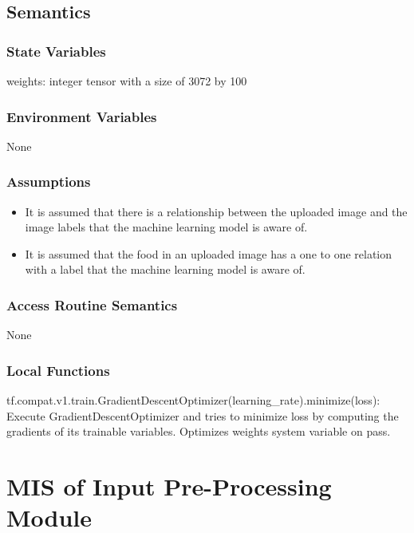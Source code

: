 \documentclass[12pt, titlepage]{article}
\begin{document}
\subsection{Semantics}

\subsubsection{State Variables}

weights: integer tensor with a size of 3072 by 100

\subsubsection{Environment Variables}

None

\subsubsection{Assumptions}

\begin{itemize}
	\item{It is assumed that there is a relationship between the uploaded image and the image labels that the machine learning model is aware of.}
	
	\item{It is assumed that the food in an uploaded image has a one to one relation with a label that the machine learning model is aware of.}
\end{itemize}

\subsubsection{Access Routine Semantics}

None

\subsubsection{Local Functions}

tf.compat.v1.train.GradientDescentOptimizer(learning\_rate).minimize(loss): Execute GradientDescentOptimizer and tries to minimize loss by computing the gradients of its trainable variables. Optimizes weights system variable on pass.

\newpage

\section{MIS of Input Pre-Processing Module} \label{Module}
\end{document}
